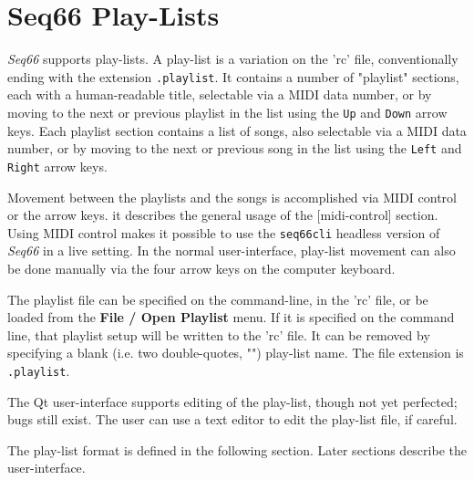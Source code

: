 %
%
%

\section{Seq66 Play-Lists}
\label{sec:playlist}

   \textsl{Seq66} supports play-lists.
   A play-list is a variation on the 'rc' file, conventionally ending with the
   extension \texttt{.playlist}.  It contains a number of "playlist" sections,
   each with a human-readable title, selectable via a MIDI data number,
   or by moving to the next or previous playlist in the list using the
   \texttt{Up} and \texttt{Down} arrow keys.
   Each playlist section contains a list of songs, also selectable via a MIDI
   data number, or by moving to the next or previous song in the list using the
   \texttt{Left} and \texttt{Right} arrow keys.

   Movement between the playlists and the songs is accomplished via 
   MIDI control or the arrow keys.
   it describes the general usage of the [midi-control] section.
   Using MIDI control makes it possible to use the \texttt{seq66cli}
   headless version of \textsl{Seq66} in a live setting.
   In the normal user-interface, play-list movement
   can also be done manually via the four arrow keys on the computer
   keyboard.

   The playlist file can be specified on the command-line, in
   the 'rc' file, or be loaded
   from the \textbf{File / Open Playlist} menu.
   If it is specified on the command line, that playlist setup will
   be written to the 'rc' file.  It can be removed by specifying a blank (i.e.
   two double-quotes, "") play-list name.
   The file extension is \texttt{.playlist}.

   The Qt user-interface supports editing of the play-list, though not yet
   perfected; bugs still exist.
   The user can use a text editor to edit the play-list file, if careful.

   The play-list format is defined in the following section.
   Later sections describe the user-interface.

